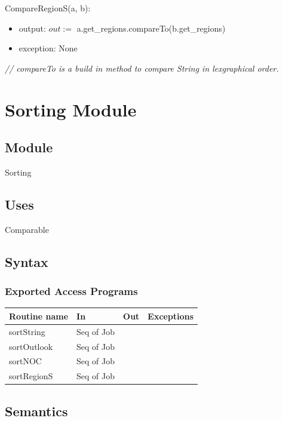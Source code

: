 \documentclass[12pt]{article}
\begin{document}
\noindent CompareRegionS(a, b):
\begin{itemize}
\item output: $out := $ a.get\_regions.compareTo(b.get\_regions)
\item exception: None
\end{itemize}
\noindent \textit{// compareTo is a build in method to compare String in lexgraphical order.}\\

\newpage

\section* {Sorting Module}

\subsection* {Module}

Sorting

\subsection* {Uses}

Comparable

\subsection* {Syntax}

\subsubsection* {Exported Access Programs}

\begin{tabular}{| l | l | l | p{6cm} |}
\hline
\textbf{Routine name} & \textbf{In} & \textbf{Out} & \textbf{Exceptions}\\
\hline
sortString & Seq of Job & ~ & \\
\hline
sortOutlook & Seq of Job & ~ & \\
\hline
sortNOC & Seq of Job & ~ & \\
\hline
sortRegionS & Seq of Job & ~ & \\
\hline
\end{tabular}

\subsection* {Semantics}
\end{document}
